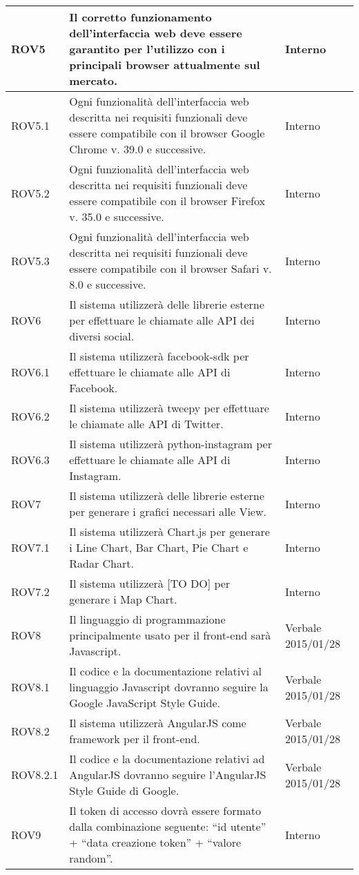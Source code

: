 \begin{center}
\begin{longtable}{| p{2.5cm} | p{8cm} | p{2cm} |}
		ROV5  &  Il corretto funzionamento dell'interfaccia web deve essere garantito per l'utilizzo con i principali browser attualmente sul mercato.   &  Interno \\
		\hline
		ROV5.1  &  Ogni funzionalità dell'interfaccia web descritta nei requisiti funzionali deve essere compatibile con il browser Google Chrome v. 39.0 e successive.   &  Interno \\
		\hline
		ROV5.2  &  Ogni funzionalità dell'interfaccia web descritta nei requisiti funzionali deve essere compatibile con il browser Firefox v. 35.0 e successive.   &  Interno \\
		\hline
		ROV5.3  &  Ogni funzionalità dell'interfaccia web descritta nei requisiti funzionali deve essere compatibile con il browser Safari v. 8.0 e successive.   &  Interno \\
		\hline

		ROV6  &  Il sistema utilizzerà delle librerie esterne per effettuare le chiamate alle API dei diversi social.  &  Interno \\
		\hline
		ROV6.1  &  Il sistema utilizzerà facebook-sdk per effettuare le chiamate alle API di Facebook.  &  Interno \\
		\hline
		ROV6.2  &  Il sistema utilizzerà tweepy per effettuare le chiamate alle API di Twitter.  &  Interno \\
		\hline
		ROV6.3  &  Il sistema utilizzerà python-instagram per effettuare le chiamate alle API di Instagram.  &  Interno \\
		\hline

		ROV7  &  Il sistema utilizzerà delle librerie esterne per generare i grafici necessari alle View.  &  Interno \\
		\hline
		ROV7.1  &  Il sistema utilizzerà Chart.js per generare i Line Chart, Bar Chart, Pie Chart e Radar Chart.  &  Interno \\
		\hline
		ROV7.2  &  Il sistema utilizzerà [TO DO] per generare i Map Chart.  &  Interno \\
		\hline

		ROV8  &  Il linguaggio di programmazione principalmente usato per il front-end sarà Javascript.  &  Verbale 2015/01/28 \\
		\hline
		ROV8.1 & Il codice e la documentazione relativi al linguaggio Javascript dovranno seguire la Google JavaScript Style Guide. & Verbale 2015/01/28 \\
		\hline
		ROV8.2  &  Il sistema utilizzerà AngularJS come framework per il front-end.  &  Verbale 2015/01/28 \\
		\hline
		ROV8.2.1 & Il codice e la documentazione relativi ad AngularJS dovranno seguire l'AngularJS Style Guide di Google. & Verbale 2015/01/28 \\

		ROV9  &  Il token di accesso dovrà essere formato dalla combinazione seguente: ``id utente'' + ``data creazione token'' + ``valore random''.  &  Interno \\
		\hline

	\end{longtable}
	\egroup
\end{center}

